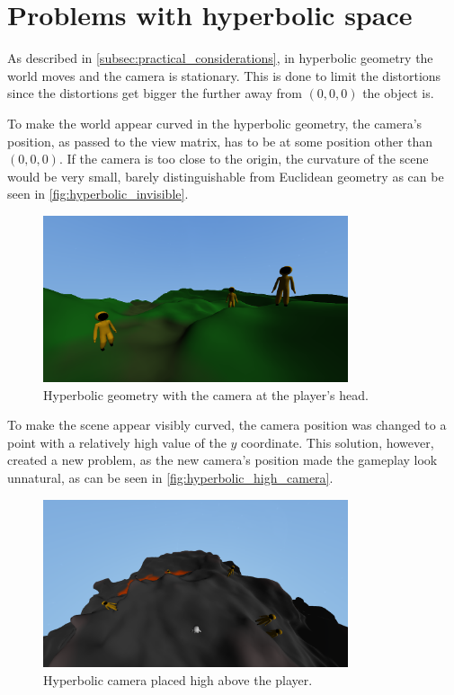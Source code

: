 \section{Problems with hyperbolic space} \label{sec:hyperbolic_problems}
As described in \autoref{subsec:practical_considerations}, in hyperbolic geometry the world moves and the camera is stationary.
This is done to limit the distortions since the distortions get bigger the further away from $(0, 0, 0)$ the object is.

To make the world appear curved in the hyperbolic geometry, the camera's position, as passed to the view matrix, has to be at some position other than $(0, 0, 0)$.
If the camera is too close to the origin, the curvature of the scene would be very small, barely distinguishable from Euclidean geometry as can be seen in \autoref{fig:hyperbolic_invisible}.

\begin{figure}[h]
    \centering
    \includegraphics[width=0.8\textwidth]{chapters/problems/resources/hyperbolic-invisible.png}
    \caption{Hyperbolic geometry with the camera at the player's head.}
    \label{fig:hyperbolic_invisible}
\end{figure}

To make the scene appear visibly curved, the camera position was changed to a point with a relatively high value of the $y$ coordinate.
This solution, however, created a new problem, as the new camera's position made the gameplay look unnatural, as can be seen in \autoref{fig:hyperbolic_high_camera}.

\begin{figure}[h]
    \centering
    \includegraphics[width=0.8\textwidth]{chapters/problems/resources/hyperbolic-high-camera.png}
    \caption{Hyperbolic camera placed high above the player.}
    \label{fig:hyperbolic_high_camera}
\end{figure}

